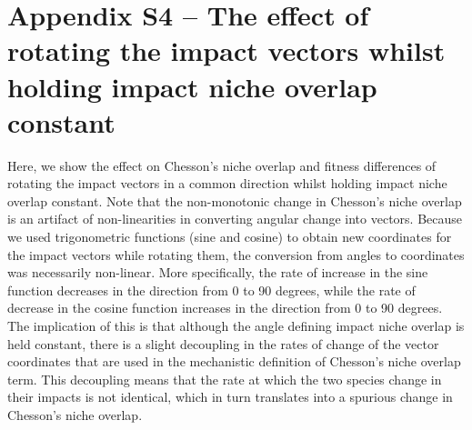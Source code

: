 \clearpage
\section{Appendix S4 -- The effect of rotating the impact vectors whilst holding impact niche overlap constant}
Here, we show the effect on Chesson's niche overlap and fitness differences of rotating the impact vectors in a common direction whilst holding impact niche overlap constant. Note that the non-monotonic change in Chesson's niche overlap is an artifact of non-linearities in converting angular change into vectors. Because we used trigonometric functions (sine and cosine) to obtain new coordinates for the impact vectors while rotating them, the conversion from angles to coordinates was necessarily non-linear. More specifically, the rate of increase in the sine function decreases in the direction from 0 to 90 degrees, while the rate of decrease in the cosine function increases in the direction from 0 to 90 degrees. The implication of this is that although the angle defining impact niche overlap is held constant, there is a slight decoupling in the rates of change of the vector coordinates that are used in the mechanistic definition of Chesson's niche overlap term. This decoupling means that the rate at which the two species change in their impacts is not identical, which in turn translates into a spurious change in Chesson's niche overlap.  
\par



